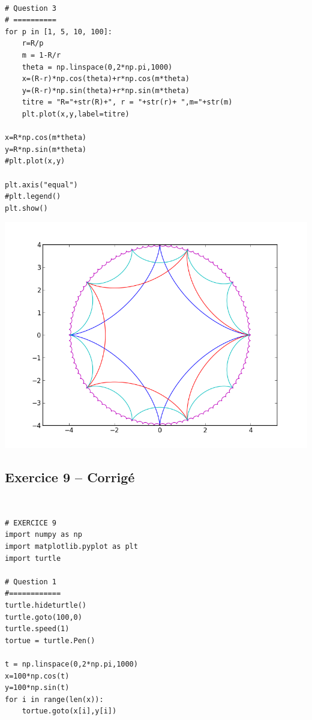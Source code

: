 \documentclass[10pt,fleqn]{article} %
\begin{document}
\begin{corrige}
$\quad$
\begin{lstlisting}
# Question 3
# ==========
for p in [1, 5, 10, 100]:
    r=R/p
    m = 1-R/r
    theta = np.linspace(0,2*np.pi,1000)
    x=(R-r)*np.cos(theta)+r*np.cos(m*theta)
    y=(R-r)*np.sin(theta)+r*np.sin(m*theta)
    titre = "R="+str(R)+", r = "+str(r)+ ",m="+str(m)
    plt.plot(x,y,label=titre)

x=R*np.cos(m*theta)
y=R*np.sin(m*theta)
#plt.plot(x,y)

plt.axis("equal")
#plt.legend()
plt.show()
\end{lstlisting}
\end{corrige}

\begin{center}
\includegraphics[width=.4\linewidth]{images/exo_FB_07_2}
\end{center}




\subsection*{Exercice 9 -- Corrigé}

\begin{corrige}
$\quad$
\begin{lstlisting}
# EXERCICE 9
import numpy as np
import matplotlib.pyplot as plt
import turtle

# Question 1 
#============
turtle.hideturtle()
turtle.goto(100,0)
turtle.speed(1)
tortue = turtle.Pen()

t = np.linspace(0,2*np.pi,1000)
x=100*np.cos(t)
y=100*np.sin(t)
for i in range(len(x)):
    tortue.goto(x[i],y[i])
\end{lstlisting}
\end{corrige}
\end{document}
